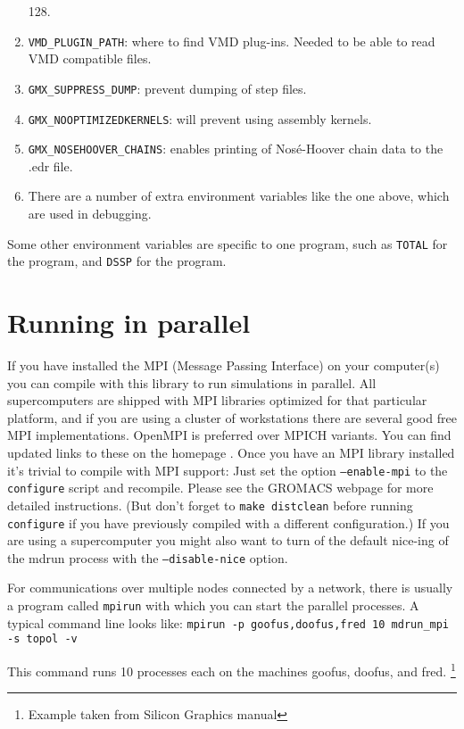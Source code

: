 \begin{enumerate}
  128.
\item {\tt VMD_PLUGIN_PATH}: where to find VMD plug-ins. Needed to be
  able to read VMD compatible files.
\item {\tt GMX_SUPPRESS_DUMP}: prevent dumping of step files.
\item {\tt GMX_NOOPTIMIZEDKERNELS}: will prevent using assembly
  kernels.
\item {\tt GMX_NOSEHOOVER_CHAINS}: enables printing of Nos{\'e}-Hoover chain data
  to the .edr file.
\item There are a number of extra environment variables like the one
  above, which are used in debugging.
\end{enumerate}

Some other environment variables are specific to one program, such as
{\tt TOTAL} for the {\tt {}} program, and {\tt DSSP} for the
{\tt {}} program.

\section{Running {\gromacs} in parallel}
If you have installed the MPI (Message Passing Interface) on your computer(s)
you can compile {\gromacs} with this library to run simulations in parallel. 
All supercomputers are shipped with MPI libraries optimized for 
that particular platform, and if you are using a cluster of workstations
there are several good free MPI implementations. OpenMPI is preferred over MPICH variants. You can find updated links
to these on the {\gromacs} homepage {\wwwpage}. Once you have an MPI library
installed it's trivial to compile {\gromacs} with MPI support: Just set
the option {\tt --enable-mpi} to the {\tt configure} script and recompile. Please see the GROMACS webpage for more detailed instructions.
(But don't forget to {\tt make distclean} before running {\tt configure} if you have
previously compiled with a different configuration.) If you are using a 
supercomputer you might also want to turn of the default nice-ing of the
mdrun process with the {\tt --disable-nice} option.

For communications over multiple nodes connected by a network,
there is usually a program called {\tt mpirun} with which you can start 
the parallel processes. A typical command line looks like:
{\tt mpirun -p goofus,doofus,fred 10 mdrun_mpi -s topol -v}

This command runs 10 processes each on the machines goofus, doofus, and fred.
\footnote{Example taken from Silicon Graphics manual}

